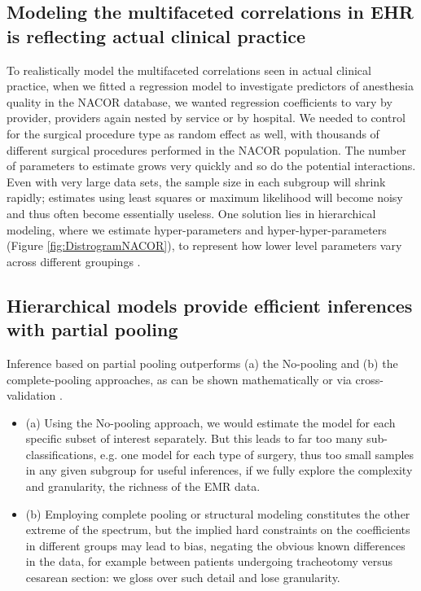 \documentclass[11pt,notitlepage]{article}
\begin{document}
\subsection*{Modeling the multifaceted correlations in EHR is reflecting actual clinical practice}
To realistically model the multifaceted correlations seen in actual clinical practice, when we fitted a regression model to investigate predictors of anesthesia quality in the NACOR database, we wanted regression coefficients to vary by provider, providers again nested by service or by hospital\cite{AndreaeWhite2015}. We needed to control for the surgical procedure type as random effect as well, with thousands of different surgical procedures performed in the NACOR population. The number of parameters to estimate grows very quickly and so do the potential interactions. Even with very large data sets, the sample size in each subgroup will shrink rapidly; estimates using least squares or maximum likelihood will become noisy and thus often become essentially useless. One solution lies in hierarchical modeling, where we estimate hyper-parameters and hyper-hyper-parameters (Figure \ref{fig:DistrogramNACOR}), to represent how lower level parameters vary across different groupings \cite{Bafumi2007}.

\subsection*{Hierarchical models provide efficient inferences with partial pooling}
Inference based on partial pooling outperforms (a) the No-pooling and (b) the complete-pooling approaches, as can be shown mathematically \cite{Efron_1975} or via cross-validation \cite{Gelman2014}.  

\begin{itemize}

\item (a) Using the No-pooling approach, we would estimate the model for each specific subset of interest separately. But this leads to far too many sub-classifications, e.g. one model for each type of surgery, thus too small samples in any given subgroup for useful inferences, if we fully explore the complexity and granularity, the richness of the EMR data. 
\item (b) Employing complete pooling or structural modeling constitutes the other extreme of the spectrum, but the implied hard constraints on the coefficients in different groups may lead to bias, negating the obvious known differences in the data, for example between patients undergoing tracheotomy versus cesarean section: we gloss over such detail and lose granularity. 
\end{itemize}
\end{document}
